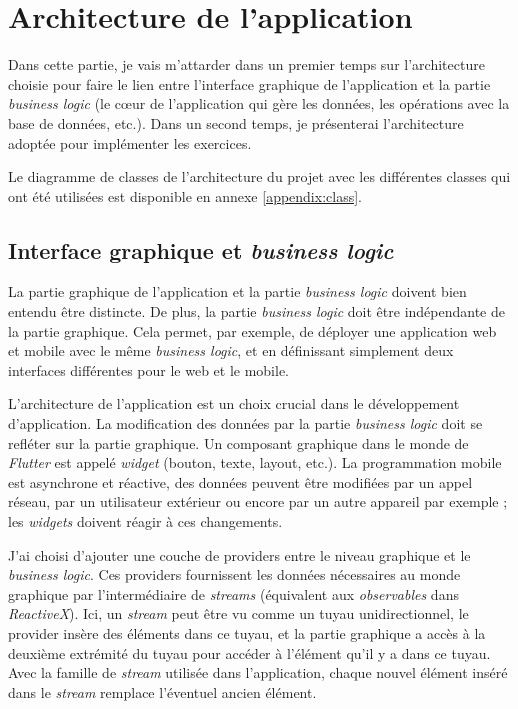 \section{Architecture de l'application}

Dans cette partie, je vais m'attarder dans un premier temps sur l'architecture choisie pour faire le lien entre l'interface graphique de l'application et la partie \textit{business logic} (le cœur de l'application qui gère les données, les opérations avec la base de données, etc.). Dans un second temps, je présenterai l'architecture adoptée pour implémenter les exercices.

Le diagramme de classes de l'architecture du projet avec les différentes classes qui ont été utilisées est disponible en annexe \ref{appendix:class}.

\subsection{Interface graphique et \textit{business logic}}
La partie graphique de l'application et la partie \textit{business logic} doivent bien entendu être distincte. De plus, la partie \textit{business logic} doit être indépendante de la partie graphique. Cela permet, par exemple, de déployer une application web et mobile avec le même \textit{business logic}, et en définissant simplement deux interfaces différentes pour le web et le mobile.

L'architecture de l'application est un choix crucial dans le développement d'application. La modification des données par la partie \textit{business logic} doit se refléter sur la partie graphique. Un composant graphique dans le monde de \textit{Flutter} est appelé \textit{widget} (bouton, texte, layout, etc.). La programmation mobile est asynchrone et réactive, des données peuvent être modifiées par un appel réseau, par un utilisateur extérieur ou encore par un autre appareil par exemple ; les \textit{widgets} doivent réagir à ces changements.

J'ai choisi d'ajouter une couche de providers entre le niveau graphique et le \textit{business logic}. Ces providers fournissent les données nécessaires au monde graphique par l'intermédiaire de \textit{streams} (équivalent aux \textit{observables} dans \textit{ReactiveX}). Ici, un \textit{stream} peut être vu comme un tuyau unidirectionnel, le provider insère des éléments dans ce tuyau, et la partie graphique a accès à la deuxième extrémité du tuyau pour accéder à l'élément qu'il y a dans ce tuyau. Avec la famille de \textit{stream} utilisée dans l'application, chaque nouvel élément inséré dans le \textit{stream} remplace l'éventuel ancien élément.

